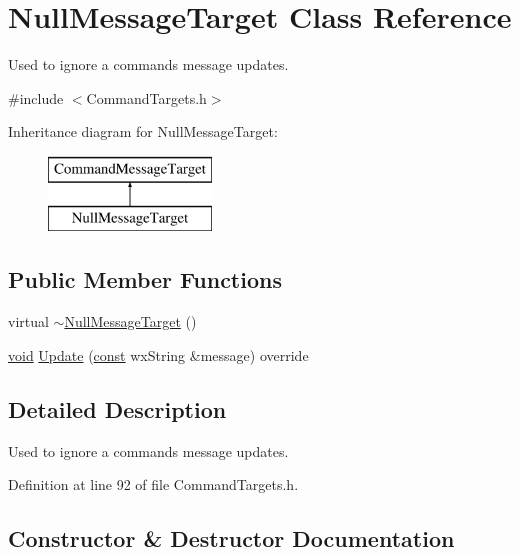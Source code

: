 \hypertarget{class_null_message_target}{}\section{Null\+Message\+Target Class Reference}
\label{class_null_message_target}


Used to ignore a command\textquotesingle{}s message updates.  




{\ttfamily \#include $<$Command\+Targets.\+h$>$}

Inheritance diagram for Null\+Message\+Target\+:\begin{figure}[H]
\begin{center}
\leavevmode
\includegraphics[height=2.000000cm]{class_null_message_target}
\end{center}
\end{figure}
\subsection*{Public Member Functions}
\begin{DoxyCompactItemize}
\item 
virtual \hyperlink{class_null_message_target_ae5fc9ad9e26db82d74dee681b3f05f65}{$\sim$\+Null\+Message\+Target} ()
\item 
\hyperlink{sound_8c_ae35f5844602719cf66324f4de2a658b3}{void} \hyperlink{class_null_message_target_a6608747e164a53a683ddbe1c52d5168e}{Update} (\hyperlink{getopt1_8c_a2c212835823e3c54a8ab6d95c652660e}{const} wx\+String \&message) override
\end{DoxyCompactItemize}


\subsection{Detailed Description}
Used to ignore a command\textquotesingle{}s message updates. 

Definition at line 92 of file Command\+Targets.\+h.



\subsection{Constructor \& Destructor Documentation}
